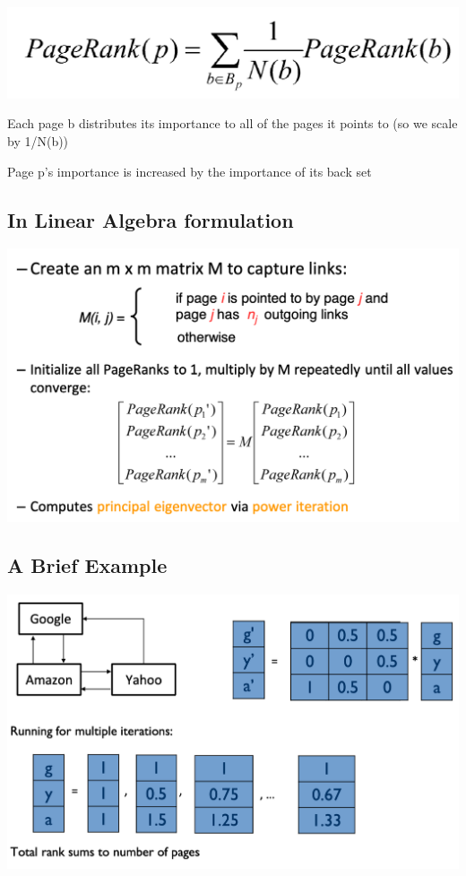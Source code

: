 \documentclass[11pt]{article}
\theoremstyle{definition}
\begin{document}
\includegraphics[width=\textwidth/4]{33.png}

Each page b distributes its importance to all of the pages it points to (so
we scale by 1/N(b))

Page p’s importance is increased by the importance of its back set

\subsection{In Linear Algebra formulation}
\includegraphics[width=\textwidth/2]{34.png}

\subsection{A Brief Example}
\includegraphics[width=\textwidth/2]{35.png}
\end{document}
